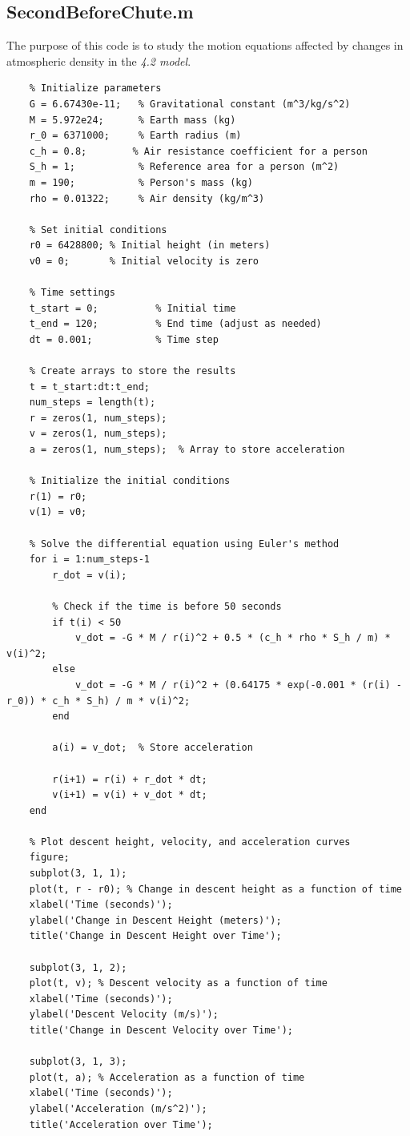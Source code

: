 \documentclass[12pt]{article}
\begin{document}
\subsection{SecondBeforeChute.m}
The purpose of this code is to study the motion equations affected by 
changes in atmospheric density in the \textit{4.2 model}.
\begin{lstlisting}
    % Initialize parameters
    G = 6.67430e-11;   % Gravitational constant (m^3/kg/s^2)
    M = 5.972e24;      % Earth mass (kg)
    r_0 = 6371000;     % Earth radius (m)
    c_h = 0.8;        % Air resistance coefficient for a person
    S_h = 1;           % Reference area for a person (m^2)
    m = 190;           % Person's mass (kg)
    rho = 0.01322;     % Air density (kg/m^3)

    % Set initial conditions
    r0 = 6428800; % Initial height (in meters)
    v0 = 0;       % Initial velocity is zero

    % Time settings
    t_start = 0;          % Initial time
    t_end = 120;          % End time (adjust as needed)
    dt = 0.001;           % Time step

    % Create arrays to store the results
    t = t_start:dt:t_end;
    num_steps = length(t);
    r = zeros(1, num_steps);
    v = zeros(1, num_steps);
    a = zeros(1, num_steps);  % Array to store acceleration

    % Initialize the initial conditions
    r(1) = r0;
    v(1) = v0;

    % Solve the differential equation using Euler's method
    for i = 1:num_steps-1
        r_dot = v(i);
        
        % Check if the time is before 50 seconds
        if t(i) < 50
            v_dot = -G * M / r(i)^2 + 0.5 * (c_h * rho * S_h / m) * v(i)^2;
        else
            v_dot = -G * M / r(i)^2 + (0.64175 * exp(-0.001 * (r(i) - r_0)) * c_h * S_h) / m * v(i)^2;
        end
        
        a(i) = v_dot;  % Store acceleration
        
        r(i+1) = r(i) + r_dot * dt;
        v(i+1) = v(i) + v_dot * dt;
    end

    % Plot descent height, velocity, and acceleration curves
    figure;
    subplot(3, 1, 1);
    plot(t, r - r0); % Change in descent height as a function of time
    xlabel('Time (seconds)');
    ylabel('Change in Descent Height (meters)');
    title('Change in Descent Height over Time');

    subplot(3, 1, 2);
    plot(t, v); % Descent velocity as a function of time
    xlabel('Time (seconds)');
    ylabel('Descent Velocity (m/s)');
    title('Change in Descent Velocity over Time');

    subplot(3, 1, 3);
    plot(t, a); % Acceleration as a function of time
    xlabel('Time (seconds)');
    ylabel('Acceleration (m/s^2)');
    title('Acceleration over Time');
\end{lstlisting}
\end{document}
